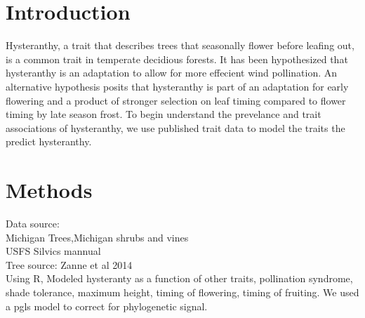 \documentclass{article}\usepackage[]{graphicx}\usepackage[]{color}
\begin{document}
\section*{Introduction}
Hysteranthy, a trait that describes trees that seasonally flower before leafing out, is a common trait in temperate decidious forests. It has been hypothesized that hysteranthy is an adaptation to allow for more effecient wind pollination. An alternative hypothesis posits that hysteranthy is part of an adaptation for early flowering and a product of stronger selection on leaf timing compared to flower timing by late season frost. To begin understand the prevelance and trait associations of hysteranthy, we use published trait data to model the traits the predict hysteranthy.

\section*{Methods}
Data source:\\ Michigan Trees,Michigan shrubs and vines\\ USFS Silvics mannual\\
Tree source: Zanne et al 2014\\
Using R, Modeled hysteranty as a function of other traits, pollination syndrome, shade tolerance, maximum height, timing of flowering, timing of fruiting. We used a pgls model to correct for phylogenetic signal.
\end{document}
